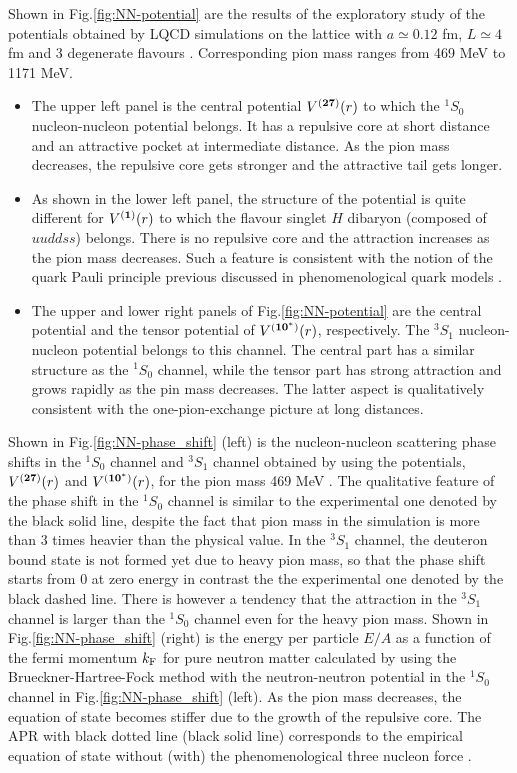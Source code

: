 Shown in Fig.\ref{fig:NN-potential}  are the results of the exploratory study of the potentials
obtained by LQCD simulations on the lattice  with $a\simeq 0.12$ fm, 
$L\simeq 4$ fm and 3 degenerate flavours  \cite{Inoue:2011ai}.  Corresponding pion mass ranges from
 469 MeV to 1171 MeV. 
\begin{itemize}
\item  The upper left panel is the 
central potential $V^{({\bf 27})}(r)$ to which the  $^1S_0$ nucleon-nucleon potential belongs.
 It  has a repulsive core at short distance and an attractive pocket at intermediate distance.
As the pion mass decreases,  the repulsive core gets stronger and the attractive tail gets
 longer.  
\item As shown in the lower left panel, the structure of the potential is quite different for $V^{({\bf 1})}(r)$ to which the
  flavour singlet $H$ dibaryon (composed of $uuddss$) belongs.   There is no repulsive core and the attraction 
  increases as the pion mass decreases.  Such a feature is consistent with the 
   notion of  the quark Pauli principle previous discussed in phenomenological quark models \cite{Oka-Fujiwara}.
\item The upper and lower right panels of  Fig.\ref{fig:NN-potential}  are the 
central potential and the tensor potential of $V^{({\bf 10}^*)}(r)$, respectively. The
$^3S_1$ nucleon-nucleon potential belongs to this channel. The central part has a similar
structure as the $^1S_0$ channel, while the tensor part has strong attraction and grows rapidly  as the 
 pin mass decreases.  The latter aspect is qualitatively consistent with the one-pion-exchange picture at
 long distances.
 \end{itemize}
   
 Shown in  Fig.\ref{fig:NN-phase_shift} (left) is  the nucleon-nucleon scattering phase shifts
  in the $^1S_0$ channel and $^3S_1$ channel obtained by using the 
   potentials, $V^{({\bf 27})}(r)$ and $V^{({\bf 10}^*)}(r)$,  for the pion mass 469 MeV \cite{Inoue:2013nfe}.
   The qualitative feature of the 
   phase shift in the $^1S_0$ channel is similar to the experimental one denoted by the 
   black solid  line, despite the fact that pion mass in the simulation is  more than 3 times
   heavier than the physical value. In the  $^3S_1$ channel, the deuteron bound state is 
   not formed yet due to heavy pion mass, so that the phase shift starts from 0 at zero energy
    in contrast the the experimental one denoted by the black dashed line.
    There is however a tendency that the attraction in the $^3S_1$ channel is larger than
   the $^1S_0$ channel even for the heavy pion mass.
  Shown in  Fig.\ref{fig:NN-phase_shift} (right) is  the energy per particle $E/A$ as a function of the 
  fermi momentum $k_{\rm F}$ for pure neutron matter calculated by using the Brueckner-Hartree-Fock method
  with the neutron-neutron potential in the $^1S_0$ channel in Fig.\ref{fig:NN-phase_shift} (left). 
 As the pion mass decreases, the equation of state becomes stiffer due to the growth of the repulsive  core. 
 The APR with black dotted line (black solid line)   corresponds to the empirical equation of state without (with) the
phenomenological three nucleon force  \cite{Akmal:1998cf}.

